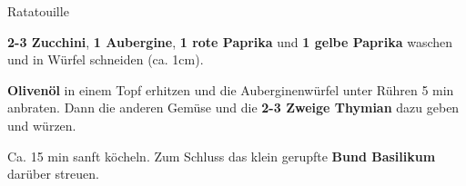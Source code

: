 \begin{recipe}[]{Ratatouille} %
	\personcount{} %

\step
\textbf{2-3 Zucchini}, \textbf{1 Aubergine}, \textbf{1 rote Paprika} und \textbf{1 gelbe Paprika} waschen und in Würfel schneiden (ca. 1cm).

\step
\textbf{Olivenöl} in einem Topf erhitzen und die Auberginenwürfel unter Rühren 5 min anbraten. Dann die anderen Gemüse und die \textbf{2-3 Zweige Thymian} dazu geben und würzen. 

\step
Ca. 15 min sanft köcheln. Zum Schluss das klein gerupfte \textbf{ Bund Basilikum} darüber streuen.



\end{recipe}
